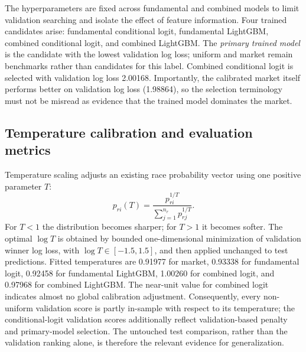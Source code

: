 The hyperparameters are fixed across fundamental and combined models to limit validation searching and isolate the effect of feature information. Four trained candidates arise: fundamental conditional logit, fundamental LightGBM, combined conditional logit, and combined LightGBM. The \emph{primary trained model} is the candidate with the lowest validation log loss; uniform and market remain benchmarks rather than candidates for this label. Combined conditional logit is selected with validation log loss 2.00168. Importantly, the calibrated market itself performs better on validation log loss (1.98864), so the selection terminology must not be misread as evidence that the trained model dominates the market.

\subsection{Temperature calibration and evaluation metrics}\label{sec:methods-metrics}
Temperature scaling adjusts an existing race probability vector using one positive parameter $T$:
\begin{equation}
p_{ri}(T)=\frac{p_{ri}^{1/T}}{\sum_{j=1}^{n_r}p_{rj}^{1/T}}.
\label{eq:temperature}
\end{equation}
For $T<1$ the distribution becomes sharper; for $T>1$ it becomes softer. The optimal $\log T$ is obtained by bounded one-dimensional minimization of validation winner log loss, with $\log T\in[-1.5,1.5]$, and then applied unchanged to test predictions. Fitted temperatures are 0.91977 for market, 0.93338 for fundamental logit, 0.92458 for fundamental LightGBM, 1.00260 for combined logit, and 0.97968 for combined LightGBM. The near-unit value for combined logit indicates almost no global calibration adjustment. Consequently, every non-uniform validation score is partly in-sample with respect to its temperature; the conditional-logit validation scores additionally reflect validation-based penalty and primary-model selection. The untouched test comparison, rather than the validation ranking alone, is therefore the relevant evidence for generalization.


